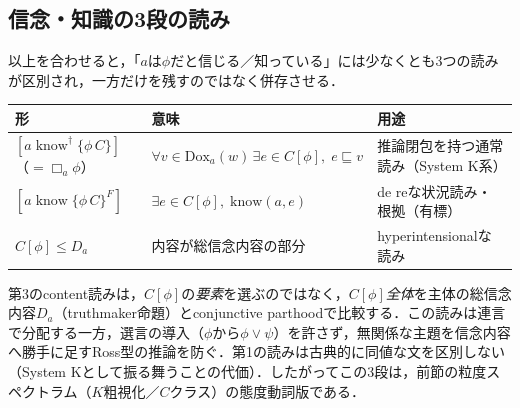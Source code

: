 \documentclass[../../main-detail.tex]{subfiles}
\begin{document}
\subsection{信念・知識の3段の読み}
以上を合わせると，「$a$は$\phi$だと信じる／知っている」には少なくとも3つの読みが区別され，一方だけを残すのではなく併存させる．
\begin{center}
\begin{tabular}{p{37mm}p{40mm}p{33mm}}
    \toprule
    形 & 意味 & 用途\\
    \midrule
    $[a\;\mathrm{know}^\dagger\;\{\phi\,C\}]$ \newline （$=\Box_a\phi$） & $\forall v\in\mathrm{Dox}_a(w)\,\exists e\in C[\phi],\; e\sqsubseteq v$ & 推論閉包を持つ通常読み（System K系）\\
    $[a\;\mathrm{know}\;\{\phi\,C\}^F]$ & $\exists e\in C[\phi],\;\mathrm{know}(a,e)$ & de reな状況読み・根拠（有標）\\
    $C[\phi]\le D_a$ & 内容が総信念内容の部分 & hyperintensionalな読み\\
    \bottomrule
\end{tabular}
\end{center}
第3のcontent読みは，$C[\phi]$の\emph{要素}を選ぶのではなく，$C[\phi]$\emph{全体}を主体の総信念内容$D_a$（truthmaker命題）とconjunctive parthoodで比較する\cite{jago-belief}．この読みは連言で分配する一方，選言の導入（$\phi$から$\phi\lor\psi$）を許さず，無関係な主題を信念内容へ勝手に足すRoss型の推論を防ぐ．第1の読みは古典的に同値な文を区別しない（System Kとして振る舞うことの代価）．したがってこの3段は，前節の粒度スペクトラム（$K$粗視化／$C$クラス）の態度動詞版である．
\end{document}
